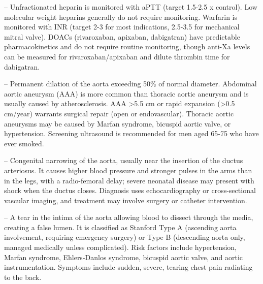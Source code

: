 -- Unfractionated heparin is monitored with aPTT (target 1.5-2.5 x control). Low molecular weight heparins generally do not require monitoring. Warfarin is monitored with INR (target 2-3 for most indications, 2.5-3.5 for mechanical mitral valve). DOACs (rivaroxaban, apixaban, dabigatran) have predictable pharmacokinetics and do not require routine monitoring, though anti-Xa levels can be measured for rivaroxaban/apixaban and dilute thrombin time for dabigatran.

-- Permanent dilation of the aorta exceeding 50\% of normal diameter. Abdominal aortic aneurysm (AAA) is more common than thoracic aortic aneurysm and is usually caused by atherosclerosis. AAA >5.5 cm or rapid expansion (>0.5 cm/year) warrants surgical repair (open or endovascular). Thoracic aortic aneurysms may be caused by Marfan syndrome, bicuspid aortic valve, or hypertension. Screening ultrasound is recommended for men aged 65-75 who have ever smoked.

-- Congenital narrowing of the aorta, usually near the insertion of the ductus arteriosus. It causes higher blood pressure and stronger pulses in the arms than in the legs, with a radio-femoral delay; severe neonatal disease may present with shock when the ductus closes. Diagnosis uses echocardiography or cross-sectional vascular imaging, and treatment may involve surgery or catheter intervention.

-- A tear in the intima of the aorta allowing blood to dissect through the media, creating a false lumen. It is classified as Stanford Type A (ascending aorta involvement, requiring emergency surgery) or Type B (descending aorta only, managed medically unless complicated). Risk factors include hypertension, Marfan syndrome, Ehlers-Danlos syndrome, bicuspid aortic valve, and aortic instrumentation. Symptoms include sudden, severe, tearing chest pain radiating to the back.

